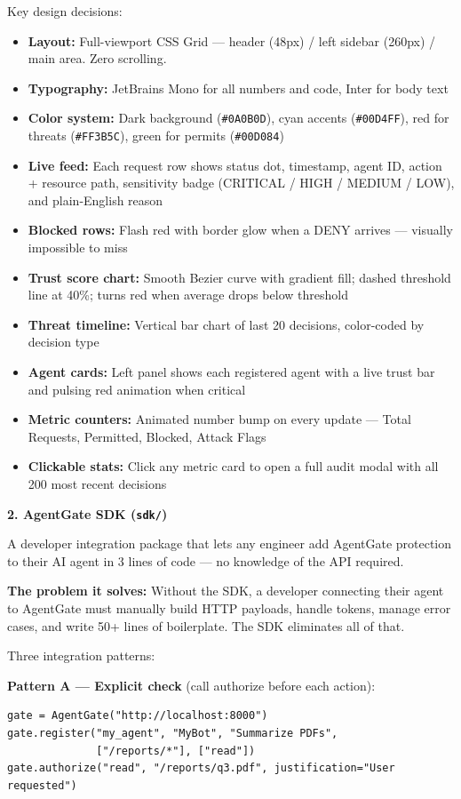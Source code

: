 \documentclass[12pt, a4paper]{article}
\begin{document}
Key design decisions:
\begin{itemize}[noitemsep]
  \item \textbf{Layout:} Full-viewport CSS Grid — header (48px) / left sidebar (260px) / main area. Zero scrolling.
  \item \textbf{Typography:} JetBrains Mono for all numbers and code, Inter for body text
  \item \textbf{Color system:} Dark background (\texttt{\#0A0B0D}), cyan accents (\texttt{\#00D4FF}), red for threats (\texttt{\#FF3B5C}), green for permits (\texttt{\#00D084})
  \item \textbf{Live feed:} Each request row shows status dot, timestamp, agent ID, action + resource path, sensitivity badge (CRITICAL / HIGH / MEDIUM / LOW), and plain-English reason
  \item \textbf{Blocked rows:} Flash red with border glow when a DENY arrives — visually impossible to miss
  \item \textbf{Trust score chart:} Smooth Bezier curve with gradient fill; dashed threshold line at 40\%; turns red when average drops below threshold
  \item \textbf{Threat timeline:} Vertical bar chart of last 20 decisions, color-coded by decision type
  \item \textbf{Agent cards:} Left panel shows each registered agent with a live trust bar and pulsing red animation when critical
  \item \textbf{Metric counters:} Animated number bump on every update — Total Requests, Permitted, Blocked, Attack Flags
  \item \textbf{Clickable stats:} Click any metric card to open a full audit modal with all 200 most recent decisions
\end{itemize}

\textbf{2. AgentGate SDK (\texttt{sdk/})}

A developer integration package that lets any engineer add AgentGate protection
to their AI agent in 3 lines of code — no knowledge of the API required.

\textbf{The problem it solves:} Without the SDK, a developer connecting their agent
to AgentGate must manually build HTTP payloads, handle tokens, manage error
cases, and write 50+ lines of boilerplate. The SDK eliminates all of that.

Three integration patterns:

\textbf{Pattern A — Explicit check} (call authorize before each action):
\begin{verbatim}
gate = AgentGate("http://localhost:8000")
gate.register("my_agent", "MyBot", "Summarize PDFs",
              ["/reports/*"], ["read"])
gate.authorize("read", "/reports/q3.pdf", justification="User requested")
\end{verbatim}
\end{document}
